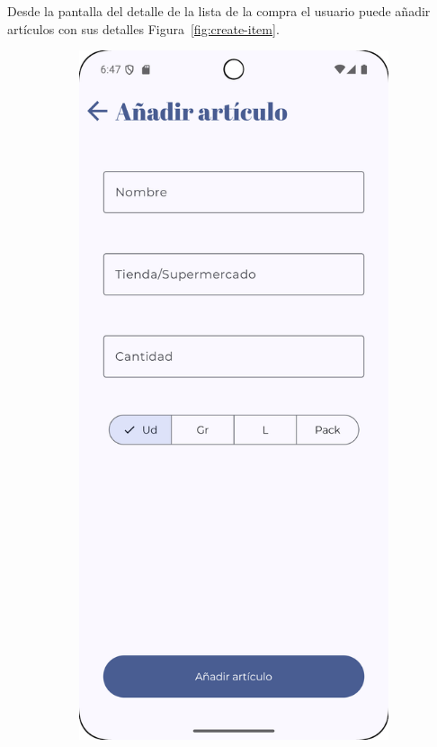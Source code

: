Desde la pantalla del detalle de la lista de la compra el usuario puede añadir artículos con sus detalles Figura~\ref{fig:create-item}.

\begin{figure}[H]
    \centering

    \begin{subfigure}[b]{0.3\textwidth}
      \includegraphics[width=\textwidth]{./img/manual/add_item_shopping_list.png}

\end{subfigure}
\end{figure}
